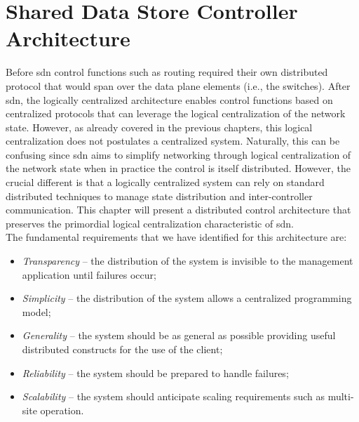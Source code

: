 
\section{Shared Data Store Controller Architecture} 
\glsresetall 

Before \gls{sdn} control functions such as routing required
their own distributed protocol that would span over the data plane
elements (i.e., the switches). 
After \gls{sdn},  the logically centralized architecture enables
control functions based on centralized protocols that can leverage
the logical centralization of the  network state.  
However, as already covered in the previous chapters, this logical
centralization does not postulates a centralized system. 
Naturally, this can be  confusing since \gls{sdn} aims to  
simplify networking through logical centralization of the network state when in practice the control is itself distributed.  
However, the crucial different is that a logically centralized system can rely on standard distributed techniques to manage state distribution and inter-controller communication. 
This chapter will present a distributed control architecture that preserves the primordial logical centralization characteristic of \gls{sdn}. \\

The fundamental requirements that we have identified for this architecture are: 

\begin{itemize}
\item[] \emph{Transparency} -- the distribution of the system is invisible to the management application until failures occur;
\item[] \emph{Simplicity}  -- the distribution of the system allows a centralized programming model; 
\item[] \emph{Generality} -- the system should be as general as
  possible providing useful distributed constructs for the use of the client;
\item[] \emph{Reliability} -- the system should be prepared to handle failures; 
\item[] \emph{Scalability} -- the system should anticipate scaling  requirements such as multi-site operation. 
\end{itemize}


